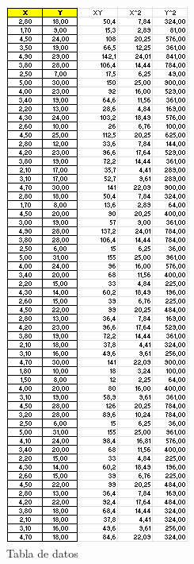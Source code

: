 \documentclass[conference]{IEEEtran}
\begin{document}
\begin{figure}[H]
	\begin{center}
		\includegraphics[width=.8\linewidth]{./Images/Tabla.png}
	\end{center}
	\caption{Tabla de datos}
\end{figure}
\end{document}
